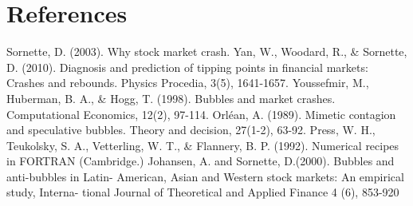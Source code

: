 \section{References}
\begin{thebibliography}{9}
	 Sornette, D. (2003). Why stock market crash.
	Yan, W., Woodard, R., \& Sornette, D. (2010). Diagnosis and prediction of tipping points in financial markets: Crashes and rebounds. Physics Procedia, 3(5), 1641-1657.
	 Youssefmir, M., Huberman, B. A., \& Hogg, T. (1998). Bubbles and market crashes. Computational Economics, 12(2), 97-114.
	 Orléan, A. (1989). Mimetic contagion and speculative bubbles. Theory and decision, 27(1-2), 63-92.
	 Press, W. H., Teukolsky, S. A., Vetterling, W. T., \& Flannery, B. P. (1992). Numerical recipes in FORTRAN (Cambridge.)
	 Johansen, A. and Sornette, D.(2000). Bubbles and anti-bubbles in Latin- American, Asian and Western stock markets: An empirical study, Interna- tional Journal of Theoretical and Applied Finance 4 (6), 853-920
\end{thebibliography}
